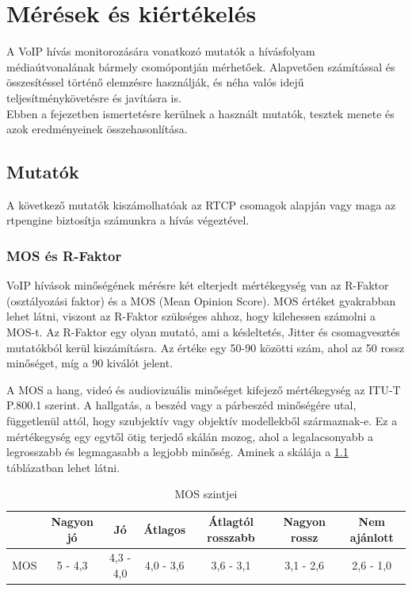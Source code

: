 \chapter{Mérések és kiértékelés}

A VoIP hívás monitorozására vonatkozó mutatók a hívásfolyam médiaútvonalának bármely 
csomópontján mérhetőek. Alapvetően számítással és összesítéssel történő elemzésre 
használják, és néha valós idejű teljesítménykövetésre és javításra is. \\

Ebben a fejezetben ismertetésre kerülnek a használt mutatók, tesztek menete és
azok eredményeinek összehasonlítása.

\section{Mutatók}

A következő mutatók kiszámolhatóak az RTCP csomagok alapján vagy maga az rtpengine
biztosítja számunkra a hívás végeztével.

\subsection{MOS és R-Faktor}

VoIP hívások minőségének mérésre két elterjedt mértékegység van az R-Faktor (osztályozási faktor)
és a MOS (Mean Opinion Score). MOS értéket gyakrabban lehet látni, viszont az R-Faktor szükséges
ahhoz, hogy kilehessen számolni a MOS-t. Az R-Faktor egy olyan mutató, ami a késleltetés, Jitter és
csomagvesztés mutatókból kerül kiszámításra. Az értéke egy 50-90 közötti szám, ahol 
az 50 rossz minőséget, míg a 90 kiválót jelent. 

A MOS a hang, videó és audiovizuális minőséget kifejező mértékegység az 
ITU-T P.800.1 szerint. A hallgatás, a beszéd vagy a párbeszéd minőségére utal, 
függetlenül attól, hogy szubjektív vagy objektív modellekből származnak-e. Ez a
mértékegység egy egytől ötig terjedő skálán mozog, ahol a legalacsonyabb a legrosszabb
és legmagasabb a legjobb minőség. Aminek a skálája a \ref{tab:mosValues} táblázatban 
lehet látni. 

\begin{table}[ht]
	\footnotesize
	\centering
	\begin{tabular}{l c c c c c c}
		\toprule
		 & Nagyon jó & Jó & Átlagos & Átlagtól rosszabb & Nagyon rossz & Nem ajánlott\\
		\midrule
		MOS & 5 - 4,3 & 4,3 - 4,0 & 4,0 - 3,6 & 3,6 - 3,1 & 3,1 - 2,6 & 2,6 - 1,0\\
		\bottomrule
	\end{tabular}
	\caption{MOS szintjei}
	\label{tab:mosValues}
\end{table}

